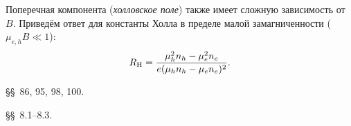 \begin{lab:example}
Поперечная компонента (\emph{холловское поле}) также имеет сложную
зависимость от~$B$. Приведём ответ для константы Холла
в пределе малой замагниченности ($\mu_{e,h} B \ll 1$):
\begin{equation}
    \eqmark{3.21}
    R_{\rm H} = \frac{\mu_h^2 n_h - \mu_e^2 n_e}%
{e(\mu_hn_h-\mu_en_e)^2}.
\end{equation}
\end{lab:example}


\begin{lab:literature}
    \item \SivuhinIII \S\S~86, 95, 98, 100.
    \item \KingLokOlh \S\S~8.1--8.3.
\end{lab:literature}

